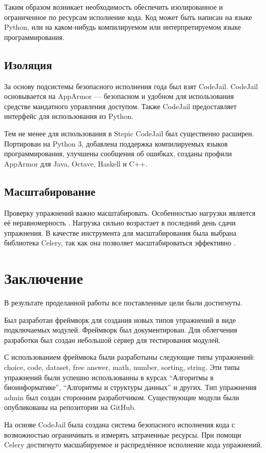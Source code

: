 \documentclass{matmex-diploma-custom}
\begin{document}
Таким образом возникает необходимость обеспечить изолированное
и ограниченное по ресурсам исполнение кода. Код может быть написан на
языке Python, или на каком-нибудь компилируемом или интерпретируемом
языке программирования.

\subsection{Изоляция}
За основу подсистемы безопасного исполнения года был взят
CodeJail. CodeJail основывается на AppArmor --- безопасном\cite{Bauer} и удобном
для использования\cite{Schreuders} средстве мандатного управления
доступом. Также CodeJail предоставляет интерфейс для использования из Python.

Тем не менее для использования в Stepic CodeJail был существенно
расширен. Портирован на Python 3, добавлена поддержка компилируемых
языков программирования, улучшены сообщения об ошибках, созданы
профили AppArmor для Java, Octave, Haskell и C++.

\subsection{Масштабирование}
Проверку упражнений важно масштабировать. Особенностью нагрузки
является её неравномерность \cite{breslow2013studying}. Нагрузка
сильно возрастает в последний день сдачи упражнения. В качестве
инструмента для масштабирования была выбрана библиотека Celery, так
как она позволяет масштабироваться эффективно \cite{celery}.

\section*{Заключение}
В результате проделанной работы все поставленные цели были
достигнуты.

Был разработан фреймворк для создания новых типов упражнений в виде
подключаемых модулей. Фреймворк был документирован. Для облегчения
разработки был создан небольшой сервер для тестирования модулей.

С использованием фреймвока были разработыны следующие типы упражнений:
choice, code, dataset, free answer, math, number, sorting, string. Эти
типы упражнений были успешно использованны в курсах ``Алгоритмы в
биоинформатике'', ``Алгоритмы и структуры данных'' и других. Тип
упражнения admin был создан сторонним разработчиком. Существующие
модули были опубликованы на репозитории на GitHub.

На основе CodeJail была создана система безопасного исполнения кода с
возможностью ограничивать и измерять затраченные ресурсы. При помощи
Celery достигнуто масшабируемое и распредлённое исполнение кода упражнений.



\end{document}
